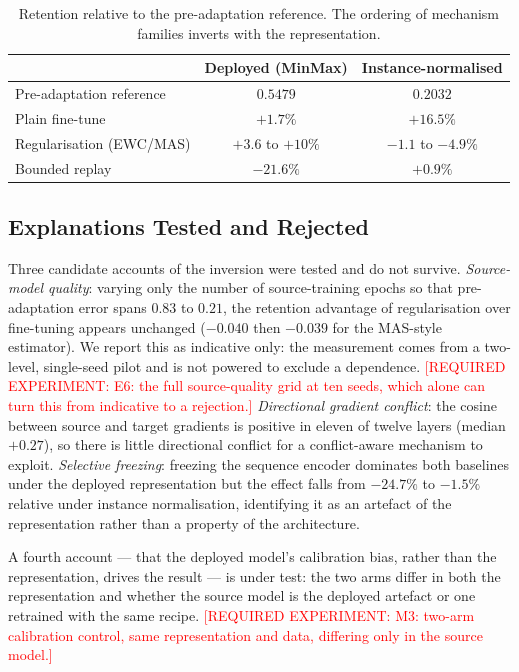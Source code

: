 \documentclass[journal]{IEEEtran}
\newcommand{\needexp}[1]{\textcolor{red}{[REQUIRED EXPERIMENT: #1]}}
\begin{document}
\begin{table}[t]
\centering
\caption{Retention relative to the pre-adaptation reference. The ordering of
mechanism families inverts with the representation.}
\label{tab:inversion}
\begin{tabular}{@{}lcc@{}}
\toprule
& Deployed (MinMax) & Instance-normalised \\
\midrule
Pre-adaptation reference & $0.5479$ & $0.2032$ \\
\midrule
Plain fine-tune & $+1.7\%$ & $+16.5\%$ \\
Regularisation (EWC/MAS) & $+3.6$ to $+10\%$ & $\mathbf{-1.1}$ to $\mathbf{-4.9\%}$ \\
Bounded replay & $\mathbf{-21.6\%}$ & $+0.9\%$ \\
\bottomrule
\end{tabular}
\end{table}

\subsection{Explanations Tested and Rejected}
Three candidate accounts of the inversion were tested and do not survive.
\emph{Source-model quality}: varying only the number of source-training epochs
so that pre-adaptation error spans $0.83$ to $0.21$, the retention advantage of
regularisation over fine-tuning appears unchanged ($-0.040$ then $-0.039$ for
the MAS-style estimator). We report this as indicative only: the measurement
comes from a two-level, single-seed pilot and is not powered to exclude a
dependence. \needexp{E6: the full source-quality grid at ten seeds, which alone
can turn this from indicative to a rejection.}
\emph{Directional gradient conflict}: the cosine between source and target
gradients is positive in eleven of twelve layers (median $+0.27$), so there is
little directional conflict for a conflict-aware mechanism to exploit.
\emph{Selective freezing}: freezing the sequence encoder dominates both
baselines under the deployed representation but the effect falls from $-24.7\%$
to $-1.5\%$ relative under instance normalisation, identifying it as an artefact
of the representation rather than a property of the architecture.

A fourth account --- that the deployed model's calibration bias, rather than the
representation, drives the result --- is under test: the two arms differ in both
the representation and whether the source model is the deployed artefact or one
retrained with the same recipe. \needexp{M3: two-arm calibration control, same
representation and data, differing only in the source model.}
\end{document}
